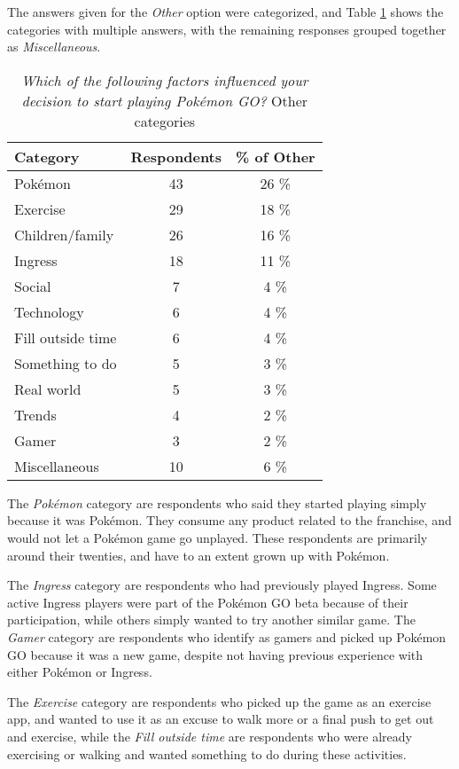 The answers given for the \emph{Other} option were categorized, and Table \ref{tbl:initial-interest-other-categories} shows the categories with multiple answers, with the remaining responses grouped together as \emph{Miscellaneous}.

\begin{table}[h]
	\caption{\emph{Which of the following factors influenced your decision to start playing Pokémon GO?} Other categories}
	\centering
	\label{tbl:initial-interest-other-categories}
	\begin{tabular}{|l|c|c|}
		\hline
		\textbf{Category} & \textbf{Respondents} & \textbf{\% of Other}\\
		\hline\hline
		Pokémon & 43 & 26 \%\\\hline
		Exercise & 29 & 18 \%\\\hline
		Children/family & 26 & 16 \%\\\hline
		Ingress & 18 & 11 \%\\\hline
		Social & 7 & 4 \%\\\hline
		Technology & 6 & 4 \%\\\hline
		Fill outside time & 6 & 4 \%\\\hline
		Something to do & 5 & 3 \%\\\hline
		Real world & 5 & 3 \%\\\hline
		Trends & 4 & 2 \%\\\hline
		Gamer & 3 & 2 \%\\\hline
		Miscellaneous & 10 & 6 \%\\\hline
	\end{tabular}
\end{table}

The \emph{Pokémon} category are respondents who said they started playing simply because it was Pokémon. They consume any product related to the franchise, and would not let a Pokémon game go unplayed. These respondents are primarily around their twenties, and have to an extent grown up with Pokémon.

The \emph{Ingress} category are respondents who had previously played Ingress. Some active Ingress players were part of the Pokémon GO beta because of their participation, while others simply wanted to try another similar game. The \emph{Gamer} category are respondents who identify as gamers and picked up Pokémon GO because it was a new game, despite not having previous experience with either Pokémon or Ingress.

The \emph{Exercise} category are respondents who picked up the game as an exercise app, and wanted to use it as an excuse to walk more or a final push to get out and exercise, while the \emph{Fill outside time} are respondents who were already exercising or walking and wanted something to do during these activities.

